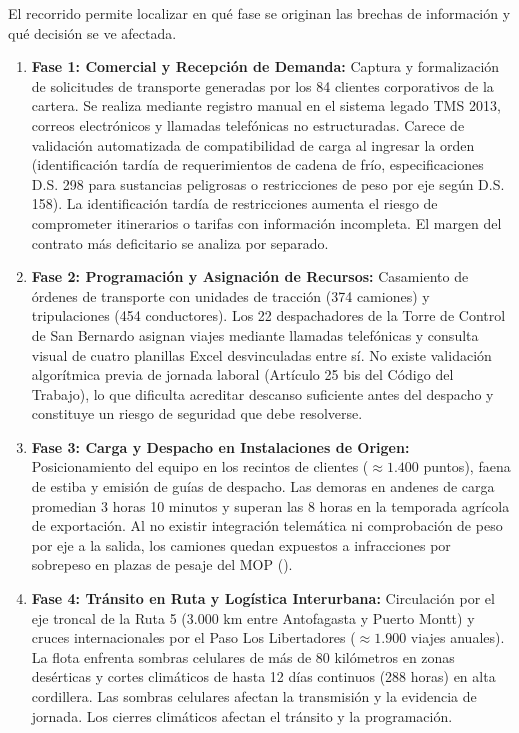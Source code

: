 El recorrido permite localizar en qué fase se originan las brechas de información y qué decisión se ve afectada.

\begin{enumerate}
  \item \textbf{Fase 1: Comercial y Recepción de Demanda:} Captura y formalización de solicitudes de transporte generadas por los 84 clientes corporativos de la cartera. Se realiza mediante registro manual en el sistema legado TMS 2013, correos electrónicos y llamadas telefónicas no estructuradas. Carece de validación automatizada de compatibilidad de carga al ingresar la orden (identificación tardía de requerimientos de cadena de frío, especificaciones D.S. 298 para sustancias peligrosas o restricciones de peso por eje según D.S. 158). La identificación tardía de restricciones aumenta el riesgo de comprometer itinerarios o tarifas con información incompleta. El margen del contrato más deficitario se analiza por separado.
  \item \textbf{Fase 2: Programación y Asignación de Recursos:} Casamiento de órdenes de transporte con unidades de tracción (374 camiones) y tripulaciones (454 conductores). Los 22 despachadores de la Torre de Control de San Bernardo asignan viajes mediante llamadas telefónicas y consulta visual de cuatro planillas Excel desvinculadas entre sí. No existe validación algorítmica previa de jornada laboral (Artículo 25 bis del Código del Trabajo), lo que dificulta acreditar descanso suficiente antes del despacho y constituye un riesgo de seguridad que debe resolverse.
  \item \textbf{Fase 3: Carga y Despacho en Instalaciones de Origen:} Posicionamiento del equipo en los recintos de clientes ($\approx 1.400$ puntos), faena de estiba y emisión de guías de despacho. Las demoras en andenes de carga promedian 3 horas 10 minutos y superan las 8 horas en la temporada agrícola de exportación. Al no existir integración telemática ni comprobación de peso por eje a la salida, los camiones quedan expuestos a infracciones por sobrepeso en plazas de pesaje del MOP ().
  \item \textbf{Fase 4: Tránsito en Ruta y Logística Interurbana:} Circulación por el eje troncal de la Ruta 5 (3.000 km entre Antofagasta y Puerto Montt) y cruces internacionales por el Paso Los Libertadores ($\approx 1.900$ viajes anuales). La flota enfrenta sombras celulares de más de 80 kilómetros en zonas desérticas y cortes climáticos de hasta 12 días continuos (288 horas) en alta cordillera. Las sombras celulares afectan la transmisión y la evidencia de jornada. Los cierres climáticos afectan el tránsito y la programación.

\end{enumerate}
